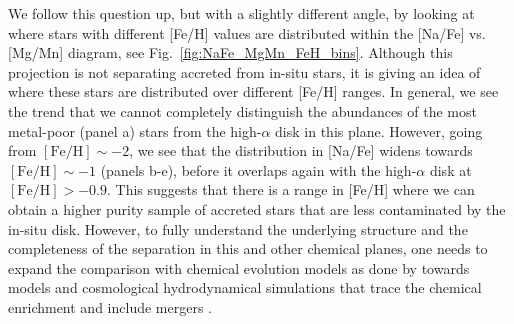 \documentclass[fleqn,usenatbib]{mnras}
\begin{document}
We follow this question up, but with a slightly different angle, by looking at where stars with different [Fe/H] values are distributed within the [Na/Fe] vs. [Mg/Mn] diagram, see Fig.~\ref{fig:NaFe_MgMn_FeH_bins}. Although this projection is not separating accreted from in-situ stars, it is giving an idea of where these stars are distributed over different [Fe/H] ranges. In general, we see the trend that we cannot completely distinguish the abundances of the most metal-poor (panel a) stars from the high-$\alpha$ disk in this plane. However, going from $\mathrm{[Fe/H]} \sim -2$, we see that the distribution in [Na/Fe] widens towards $\mathrm{[Fe/H]} \sim -1$ (panels b-e), before it overlaps again with the high-$\alpha$ disk at $\mathrm{[Fe/H]} > - 0.9$. This suggests that there is a range in [Fe/H] where we can obtain a higher purity sample of accreted stars that are less contaminated by the in-situ disk. However, to fully understand the underlying structure and the completeness of the separation in this and other chemical planes, one needs to expand the comparison with chemical evolution models as done by \citet{Horta2021} towards models and cosmological hydrodynamical simulations that trace the chemical enrichment and include mergers \citep{Buck2020, Buck2021, Sestito2021}.
\end{document}
